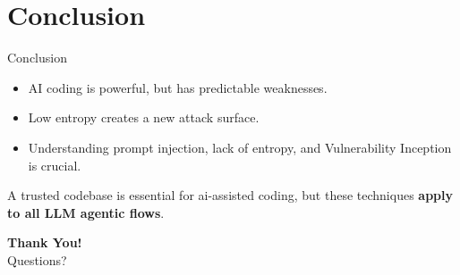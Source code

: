 \documentclass[aspectratio=169]{beamer}
\begin{document}
\section{Conclusion}
\begin{frame}{Conclusion}
%
\vspace{0.5cm}
\begin{itemize}
    \item AI coding is powerful, but has \alert{predictable weaknesses}.
    \item Low entropy creates a \alert{new attack surface}.
    \item Understanding \alert{prompt injection}, \alert{lack of entropy}, and \alert{Vulnerability Inception} is crucial.
\end{itemize}
    \begin{center}A \alert{trusted codebase} is essential for ai-assisted coding,
     but these techniques \textbf{apply to all LLM agentic flows}.\end{center}
\vspace{0.5cm}
\begin{center}
\Large{\textbf{Thank You!}}\\
\vspace{0.2cm}
\normalsize{Questions?}
\end{center}
\end{frame}
\end{document}

